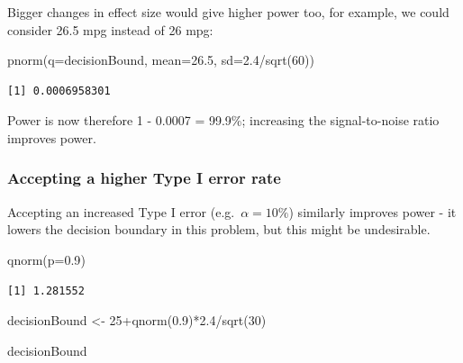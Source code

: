\documentclass[
  oneside]{krantz}
\newenvironment{Shaded}{\begin{snugshade}}{\end{snugshade}}
\newcommand{\AttributeTok}[1]{\textcolor[rgb]{0.77,0.63,0.00}{#1}}
\newcommand{\DecValTok}[1]{\textcolor[rgb]{0.00,0.00,0.81}{#1}}
\newcommand{\FloatTok}[1]{\textcolor[rgb]{0.00,0.00,0.81}{#1}}
\newcommand{\FunctionTok}[1]{\textcolor[rgb]{0.00,0.00,0.00}{#1}}
\newcommand{\NormalTok}[1]{#1}
\newcommand{\OtherTok}[1]{\textcolor[rgb]{0.56,0.35,0.01}{#1}}
\newcommand{\SpecialCharTok}[1]{\textcolor[rgb]{0.00,0.00,0.00}{#1}}
\begin{document}
Bigger changes in effect size would give higher power too, for example, we could consider 26.5 mpg instead of 26 mpg:

\begin{Shaded}
\begin{Highlighting}[]
\FunctionTok{pnorm}\NormalTok{(}\AttributeTok{q=}\NormalTok{decisionBound, }\AttributeTok{mean=}\FloatTok{26.5}\NormalTok{, }\AttributeTok{sd=}\FloatTok{2.4}\SpecialCharTok{/}\FunctionTok{sqrt}\NormalTok{(}\DecValTok{60}\NormalTok{))}
\end{Highlighting}
\end{Shaded}

\begin{verbatim}
[1] 0.0006958301
\end{verbatim}

Power is now therefore 1 - 0.0007 = 99.9\%; increasing the signal-to-noise ratio improves power.

\hypertarget{accepting-a-higher-type-i-error-rate}{%
\subsubsection{Accepting a higher Type I error rate}\label{accepting-a-higher-type-i-error-rate}}

Accepting an increased Type I error (e.g.~\(\alpha=10\%\)) similarly improves power - it lowers the decision boundary in this problem, but this might be undesirable.

\begin{Shaded}
\begin{Highlighting}[]
\FunctionTok{qnorm}\NormalTok{(}\AttributeTok{p=}\FloatTok{0.9}\NormalTok{)}
\end{Highlighting}
\end{Shaded}

\begin{verbatim}
[1] 1.281552
\end{verbatim}

\begin{Shaded}
\begin{Highlighting}[]
\NormalTok{decisionBound }\OtherTok{\textless{}{-}} \DecValTok{25}\SpecialCharTok{+}\FunctionTok{qnorm}\NormalTok{(}\FloatTok{0.9}\NormalTok{)}\SpecialCharTok{*}\FloatTok{2.4}\SpecialCharTok{/}\FunctionTok{sqrt}\NormalTok{(}\DecValTok{30}\NormalTok{)}

\NormalTok{decisionBound}
\end{Highlighting}
\end{Shaded}
\end{document}
